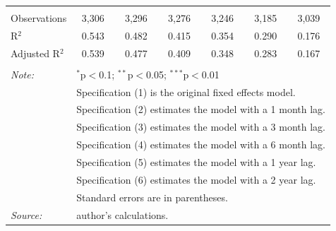 \documentclass[12pt]{article}
\begin{document}
\begin{table}[!h]
\begin{tabular}{@{\extracolsep{5pt}}lcccccc}
 \hline \\[-1.8ex] 
Observations & 3,306 & 3,296 & 3,276 & 3,246 & 3,185 & 3,039 \\ 
R$^{2}$ & 0.543 & 0.482 & 0.415 & 0.354 & 0.290 & 0.176 \\ 
Adjusted R$^{2}$ & 0.539 & 0.477 & 0.409 & 0.348 & 0.283 & 0.167 \\ 
\hline 
\hline \\[-1.8ex] 
\textit{Note:}  & \multicolumn{6}{l}{$^{*}$p$<$0.1; $^{**}$p$<$0.05; $^{***}$p$<$0.01} \\ 
 & \multicolumn{6}{l}{Specification (1) is the original fixed effects model.} \\ 
 & \multicolumn{6}{l}{Specification (2) estimates the model with a 1 month lag.} \\ 
 & \multicolumn{6}{l}{Specification (3) estimates the model with a 3 month lag.} \\ 
 & \multicolumn{6}{l}{Specification (4) estimates the model with a 6 month lag.} \\ 
 & \multicolumn{6}{l}{Specification (5) estimates the model with a 1 year lag.} \\ 
 & \multicolumn{6}{l}{Specification (6) estimates the model with a 2 year lag.} \\ 
 & \multicolumn{6}{l}{Standard errors are in parentheses.} \\ 
 \textit{Source:}& \multicolumn{6}{l}{author's calculations.} \\ 
\end{tabular} 
\end{table} 
\FloatBarrier
\end{document}
